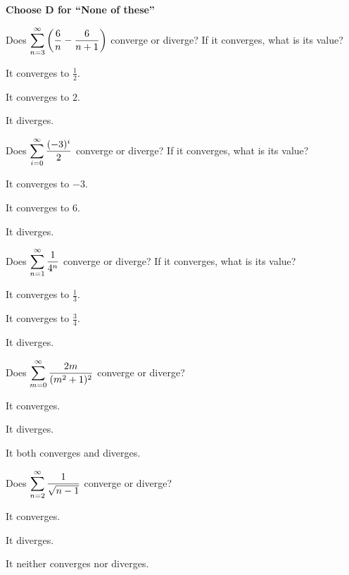 \documentclass[12pt]{exam}
\newcommand{\ds}{\ensuremath{\displaystyle}}
\newcommand{\<}{\langle}
\renewcommand{\>}{\rangle}
\begin{document}
\begin{center}
\end{center}
\vspace{0.1in}

\vspace{12pt}

\textbf{Choose D for ``None of these''}

\begin{questions}\setcounter{question}{31}

\question
Does \(\ds\sum_{n=3}^\infty\left(\frac{6}{n}-\frac{6}{n+1}\right)\) converge or
diverge? If it converges, what is its value?
\begin{choices}
\item It converges to \(\frac{1}{2}\).
\item It converges to \(2\).
\item It diverges.
\end{choices}

\question
Does \(\ds\sum_{i=0}^\infty\frac{(-3)^i}{2}\) converge or
diverge? If it converges, what is its value?
\begin{choices}
\item It converges to \(-3\).
\item It converges to \(6\).
\item It diverges.
\end{choices}

\question
Does \(\ds\sum_{n=1}^\infty\frac{1}{4^n}\) converge or
diverge? If it converges, what is its value?
\begin{choices}
\item It converges to \(\frac{1}{3}\).
\item It converges to \(\frac{3}{4}\).
\item It diverges.
\end{choices}


\newpage\thispagestyle{empty}

\begin{center}
\end{center}
\vspace{0.1in}

\question
Does \(\ds\sum_{m=0}^\infty\frac{2m}{(m^2+1)^2}\) converge or
diverge?
\begin{choices}
\item It converges.
\item It diverges.
\item It both converges and diverges.
\end{choices}

\question
Does \(\ds\sum_{n=2}^\infty\frac{1}{\sqrt{n-1}}\) converge or
diverge?
\begin{choices}
\item It converges.
\item It diverges.
\item It neither converges nor diverges.
\end{choices}

\end{questions}
\end{document}
